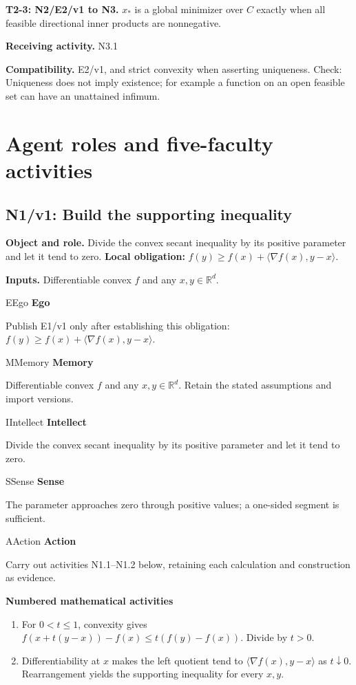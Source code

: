 \documentclass[preprint,12pt,aps,pra,showkeys,amsmath,amssymb,superscriptaddress,floatfix]{revtex4-2}
\theoremstyle{definition}
\theoremstyle{remark}
\newcommand{\mmfaculty}[3]{%
 \begin{mmfacultybox}{#1}{#2}
 {\sffamily\bfseries\color{MMBlue}#2}\par\smallskip #3
 \end{mmfacultybox}}
\newcommand{\field}[2]{\par\smallskip\noindent\textbf{#1.} #2\par}
\begin{document}
\field{T2-3: N2/E2/v1 to N3}{\(x_*\) is a global minimizer over \(C\) exactly when all feasible
directional inner products are nonnegative.}

\field{Receiving activity}{N3.1}

\field{Compatibility}{E2/v1, and strict convexity when asserting uniqueness. Check: Uniqueness
does not imply existence; for example a function on an open feasible set
can have an unattained infimum.}

\endgroup

\clearpage\section{Agent roles and five-faculty activities}\begingroup\small\linespread{1.05}\selectfont{}

\subsection{N1/v1: Build the supporting inequality}

\field{Object and role}{Divide the convex secant inequality by its positive parameter and let it
tend to zero. \textbf{Local obligation:}
\(f(y)\ge f(x)+\langle\nabla f(x),y-x\rangle\).}

\field{Inputs}{Differentiable convex \(f\) and any \(x,y\in\mathbb R^d\).}

\mmfaculty{E}{Ego}{Publish E1/v1 only after establishing this obligation:
\(f(y)\ge f(x)+\langle\nabla f(x),y-x\rangle\).}

\mmfaculty{M}{Memory}{Differentiable convex \(f\) and any \(x,y\in\mathbb R^d\). Retain the
stated assumptions and import versions.}

\mmfaculty{I}{Intellect}{Divide the convex secant inequality by its positive parameter and let it
tend to zero.}

\mmfaculty{S}{Sense}{The parameter approaches zero through positive values; a one-sided
segment is sufficient.}

\mmfaculty{A}{Action}{Carry out activities N1.1--N1.2 below, retaining each calculation and
construction as evidence.}

\smallskip\noindent\textbf{Numbered mathematical activities}

\begin{enumerate}[label=N1.\arabic*,leftmargin=3.4em]

\item For \(0<t\le1\), convexity gives \(f(x+t(y-x))-f(x)\le t(f(y)-f(x))\).
Divide by \(t>0\).

\item Differentiability at \(x\) makes the left quotient tend to
\(\langle\nabla f(x),y-x\rangle\) as \(t\downarrow0\). Rearrangement
yields the supporting inequality for every \(x,y\).

\end{enumerate}
\end{document}

